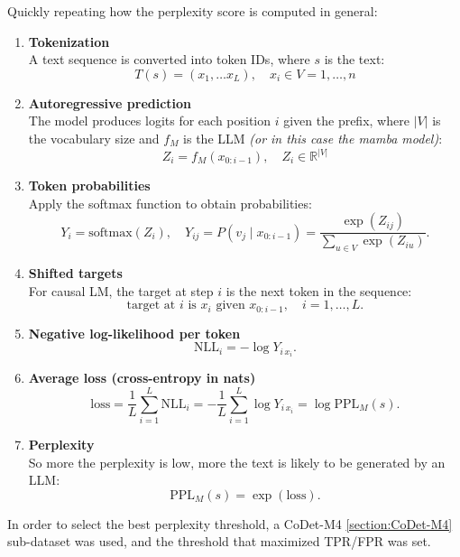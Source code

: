 Quickly repeating how the perplexity score is computed in general:
\begin{enumerate}
    \item \textbf{Tokenization} \\
    A text sequence is converted into token IDs, where $s$ is the text:
    \[
        T(s) = (x_1, \dots x_L), \quad  x_i \in V = {1, \dots, n}
    \]

    \item \textbf{Autoregressive prediction} \\
    The model produces logits for each position $i$ given the prefix, 
    where $|V|$ is the vocabulary size and $f_M$ is the 
    LLM \textit{(or in this case the mamba model)}:
    \[
        Z_i = f_M(x_{0:i-1}), \quad Z_i \in \mathbb{R}^{|V|}
    \]

    \item \textbf{Token probabilities} \\
    Apply the softmax function to obtain probabilities:
    \[
        Y_i=\mathrm{softmax}(Z_i), \quad
        Y_{ij}=P(v_j \mid x_{0:i-1})=\frac{\exp(Z_{ij})}{\sum_{u\in V}\exp(Z_{iu})}.
    \]

    \item \textbf{Shifted targets} \\
    For causal LM, the target at step $i$ is the next token in the sequence:
    \[
        \text{target at } i \text{ is } x_i \text{ given } x_{0:i-1}, \quad i=1,\dots,L.
    \]

    \item \textbf{Negative log-likelihood per token} \\
    \[
        \mathrm{NLL}_i = -\log Y_{i\,x_i}.
    \]

    \item \textbf{Average loss (cross-entropy in nats)} \\
    \[
        \mathrm{loss}=\frac{1}{L}\sum_{i=1}^{L}\mathrm{NLL}_i
        =-\frac{1}{L}\sum_{i=1}^{L}\log Y_{i\,x_i}
        =\log\mathrm{PPL}_M(s).
    \]

    \item \textbf{Perplexity} \\
    So more the perplexity is low, more the text is likely to be generated by an LLM:
    \[
        \mathrm{PPL}_M(s)=\exp(\mathrm{loss}).
    \]
\end{enumerate}

In order to select the best perplexity threshold, 
a CoDet-M4 \ref{section:CoDet-M4} sub-dataset was used, and the threshold that 
maximized TPR/FPR was set.



